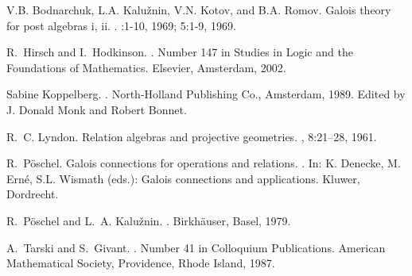 \documentclass[12pt]{au}
\begin{document}
\begin{thebibliography}{1}

V.B. Bodnarchuk, L.A. Kalu\v{z}nin, V.N. Kotov, and B.A. Romov.
\newblock Galois theory for post algebras i, ii.
.
:1-10, 1969; 5:1-9, 1969.

R.~Hirsch and I.~Hodkinson.
.
\newblock Number 147 in Studies in Logic and the Foundations of Mathematics.
  Elsevier, Amsterdam, 2002.

Sabine Koppelberg.
.
\newblock North-Holland Publishing Co., Amsterdam, 1989.
\newblock Edited by J. Donald Monk and Robert Bonnet.

R.~C. Lyndon.
\newblock Relation algebras and projective geometries.
, 8:21--28, 1961.

R.~P\"oschel.
\newblock Galois connections for operations and relations.
.
\newblock In: K. Denecke, M. Ern\'e, S.L. Wismath (eds.): Galois connections
  and applications. Kluwer, Dordrecht.

R.~P\"oschel and L.~A. Kalu\v{z}nin.
.
\newblock Birkh\"auser, Basel, 1979.

A.~Tarski and S.~Givant.
.
\newblock Number 41 in Colloquium Publications. American Mathematical Society,
  Providence, Rhode Island, 1987.

\end{thebibliography}
\end{document}
